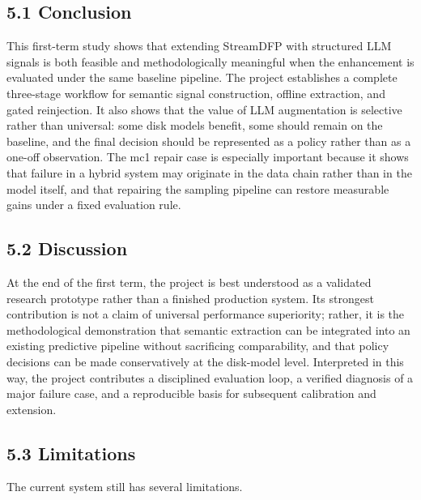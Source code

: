 \documentclass[
  11pt,
  a4paper]{article}
\begin{document}
\hypertarget{conclusion}{%
\subsection{5.1 Conclusion}\label{conclusion}}

This first-term study shows that extending StreamDFP with structured LLM
signals is both feasible and methodologically meaningful when the
enhancement is evaluated under the same baseline pipeline. The project
establishes a complete three-stage workflow for semantic signal
construction, offline extraction, and gated reinjection. It also shows
that the value of LLM augmentation is selective rather than universal:
some disk models benefit, some should remain on the baseline, and the
final decision should be represented as a policy rather than as a
one-off observation. The mc1 repair case is especially important because
it shows that failure in a hybrid system may originate in the data chain
rather than in the model itself, and that repairing the sampling
pipeline can restore measurable gains under a fixed evaluation rule.

\hypertarget{discussion}{%
\subsection{5.2 Discussion}\label{discussion}}

At the end of the first term, the project is best understood as a
validated research prototype rather than a finished production system.
Its strongest contribution is not a claim of universal performance
superiority; rather, it is the methodological demonstration that
semantic extraction can be integrated into an existing predictive
pipeline without sacrificing comparability, and that policy decisions
can be made conservatively at the disk-model level. Interpreted in this
way, the project contributes a disciplined evaluation loop, a verified
diagnosis of a major failure case, and a reproducible basis for
subsequent calibration and extension.

\hypertarget{limitations}{%
\subsection{5.3 Limitations}\label{limitations}}

The current system still has several limitations.
\end{document}
